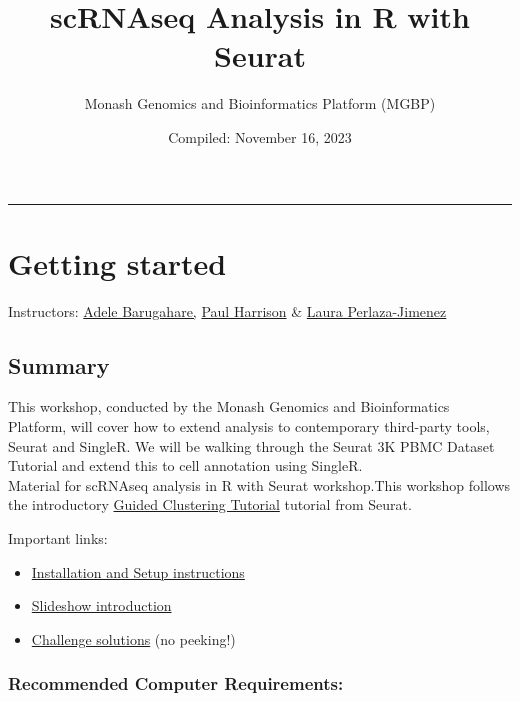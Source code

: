 \documentclass[
]{book}
\title{scRNAseq Analysis in R with Seurat}
\author{Monash Genomics and Bioinformatics Platform (MGBP)}
\date{Compiled: November 16, 2023}
\providecommand{\tightlist}{%
  \setlength{\itemsep}{0pt}\setlength{\parskip}{0pt}}
\begin{document}
\maketitle

{
\setcounter{tocdepth}{1}
\tableofcontents
}
\begin{center}\rule{0.5\linewidth}{0.5pt}\end{center}

\hypertarget{getting-started}{%
\chapter{Getting started}\label{getting-started}}

Instructors: \href{https://www.monash.edu/researchinfrastructure/bioinformatics/about/people}{Adele Barugahare,} \href{https://www.monash.edu/researchinfrastructure/bioinformatics/about/people}{Paul Harrison} \& \href{https://www.monash.edu/researchinfrastructure/bioinformatics/about/people}{Laura Perlaza-Jimenez}

\hypertarget{summary}{%
\section{Summary}\label{summary}}

This workshop, conducted by the Monash Genomics and Bioinformatics Platform, will cover how to extend analysis to contemporary third-party tools, Seurat and SingleR. We will be walking through the Seurat 3K PBMC Dataset Tutorial and extend this to cell annotation using SingleR.\\
Material for scRNAseq analysis in R with Seurat workshop.This workshop follows the introductory \href{https://satijalab.org/seurat/articles/pbmc3k_tutorial.html}{Guided Clustering Tutorial} tutorial from Seurat.

Important links:

\begin{itemize}
\tightlist
\item
  \href{set-up.html}{Installation and Setup instructions}
\item
  \href{../slides}{Slideshow introduction}
\item
  \href{solutions.html}{Challenge solutions} (no peeking!)
\end{itemize}

\hypertarget{recommended-computer-requirements}{%
\subsection{Recommended Computer Requirements:}\label{recommended-computer-requirements}}
\end{document}

